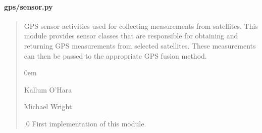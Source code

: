 \documentclass[letterpaper,10pt,english]{sphinxmanual}
\begin{document}
\paragraph{gps/sensor.py}
\label{\detokenize{modules/gps/sensor:gps-sensor-py}}\begin{quote}\begin{description}
\sphinxAtStartPar
GPS sensor activities used for collecting measurements from satellites.
This module provides sensor classes that are responsible for obtaining
and returning GPS measurements from selected satellites. These
measurements can then be passed to the appropriate GPS fusion method.

\begin{DUlineblock}{0em}
\item[] Kallum O’Hara \sphinxhyphen{} 
\item[] Michael Wright \sphinxhyphen{} 
\end{DUlineblock}

.0 \sphinxhyphen{} First implementation of this module.

\end{description}\end{quote}
\end{document}
